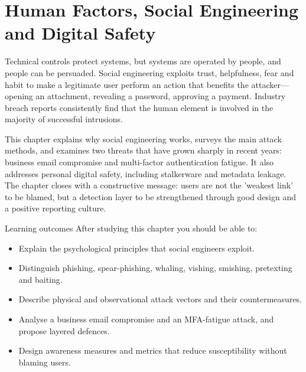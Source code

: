 \chapter{Human Factors, Social Engineering and Digital Safety}\label{ch:5}

Technical controls protect systems, but systems are operated by people, and people can be persuaded. Social engineering exploits trust, helpfulness, fear and habit to make a legitimate user perform an action that benefits the attacker—opening an attachment, revealing a password, approving a payment. Industry breach reports consistently find that the human element is involved in the majority of successful intrusions.

This chapter explains why social engineering works, surveys the main attack methods, and examines two threats that have grown sharply in recent years: business email compromise and multi-factor authentication fatigue. It also addresses personal digital safety, including stalkerware and metadata leakage. The chapter closes with a constructive message: users are not the 'weakest link' to be blamed, but a detection layer to be strengthened through good design and a positive reporting culture.

\begin{outcomesbox}{Learning outcomes}
After studying this chapter you should be able to:
\begin{itemize}
  \item Explain the psychological principles that social engineers exploit.
  \item Distinguish phishing, spear-phishing, whaling, vishing, smishing, pretexting and baiting.
  \item Describe physical and observational attack vectors and their countermeasures.
  \item Analyse a business email compromise and an MFA-fatigue attack, and propose layered defences.
  \item Design awareness measures and metrics that reduce susceptibility without blaming users.
\end{itemize}
\end{outcomesbox}

